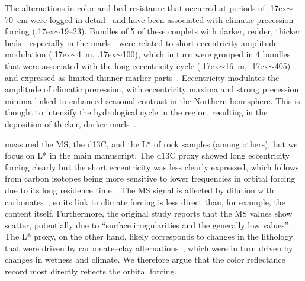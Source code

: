 \documentclass[draft]{agujournal2019}
\newcommand{\appr}{\raise.17ex\hbox{\(\scriptstyle\sim\)}} %
\begin{document}
The alternations in color and bed resistance that occurred at periods of \appr\qty{70}{\cm} were logged in detail~\cite{Batenburg2012,Dinares-Turell2013}
and have been associated with climatic precession forcing (\appr\qtyrange{19}{23}{\kiloyear}).
Bundles of 5 of these couplets with darker, redder, thicker beds---especially in the marls---were related to short eccentricity amplitude modulation (\appr\qty{4}{\metre}, \appr\qty{100}{\kiloyear}),
which in turn were grouped in 4 bundles that were associated with the long eccentricity cycle (\appr\qty{16}{\metre}, \appr\qty{405}{\kiloyear}) and expressed as limited thinner marlier parts~\cite{Batenburg2012,Batenburg2014}.
Eccentricity modulates the amplitude of climatic precession,
with eccentricity maxima and strong precession minima linked to enhanced seasonal contrast in the Northern hemisphere.
This is thought to intensify the hydrological cycle in the region, resulting in the deposition of thicker, darker marls~\cite{Batenburg2014}.

 measured the \gls{MS}, the \gls{d13C}, and the \gls{L*} of rock samples (among others), but we focus on \gls{L*} in the main manuscript.
The \gls{d13C} proxy showed long eccentricity forcing clearly but the short eccentricity was less clearly expressed,
which follows from carbon isotopes being more sensitive to lower frequencies in orbital forcing due to its long residence time~\cite{Zeebe2017,Kocken2019loscar}.
The \gls{MS} signal is affected by dilution with carbonates~\cite{tenKateSprenger1993}, so its link to climate forcing is less direct than, for example, the  content itself.
Furthermore, the original study reports that the \gls{MS} values show scatter, potentially due to ``surface irregularities and the generally low values''~\cite{Batenburg2012}.
The \gls{L*} proxy, on the other hand, likely corresponds to changes in the lithology that were driven by carbonate--clay alternations~\cite{MountWard1986,Batenburg2012},
which were in turn driven by changes in wetness and climate.
We therefore argue that the color reflectance record most directly reflects the orbital forcing.
\end{document}
